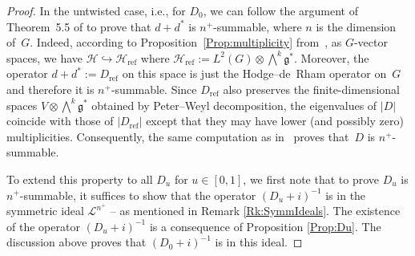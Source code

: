 \documentclass[11pt]{article}
\newcommand{\Hh}{\mathscr{H}}
\newcommand{\inj}{\hookrightarrow}
\newcommand{\LieG}{\mathfrak{g}}
\newcommand{\SymmIdeal}{\mathscr{L}}
\numberwithin{equation}{section}
\begin{document}
\begin{proof}
In the untwisted case, i.e., for $D_0$, we can follow the argument of Theorem~5.5 of \cite{TrSpLieGpGG} to prove that $d +d^*$ is $n^+$-summable, where $n$ is the dimension of~$G$. Indeed, according to Proposition~\ref{Prop:multiplicity} from~\cite{ErgodCpctGpHKLS}, as $G$-vector spaces, we have $\Hh \inj \Hh_\text{ref}$ where $\Hh_\text{ref} := L^2(G) \otimes \bigwedge^k \LieG^*$. Moreover, the operator $d +d^* := D_\text{ref}$ on this space is just the Hodge--de~Rham operator on~$G$ and therefore it is $n^+$-summable. Since $D_\text{ref}$ also preserves the f\/inite-dimensional spaces $V \otimes \bigwedge^k \LieG^*$ obtained by Peter--Weyl decomposition, the eigenvalues of $|D|$ coincide with those of $|D_\text{ref}|$ except that they may have lower (and possibly zero) multiplicities. Consequently, the same computation as in~\cite{TrSpLieGpGG} proves that~$D$ is $n^+$-summable.

To extend this property to all $D_u$ for $u \in [0,1]$, we f\/irst note that to prove $D_u$ is $n^+$-summable, it suf\/f\/ices to show that the operator $(D_u + i)^{-1}$ is in the symmetric ideal $\SymmIdeal^{n^+}$ -- as mentioned in Remark \ref{Rk:SymmIdeals}. The existence of the operator $(D_u + i)^{-1}$ is a consequence of Proposition \ref{Prop:Du}. The discussion above proves that $(D_0 + i)^{-1}$ is in this ideal.



\end{proof}
\end{document}

